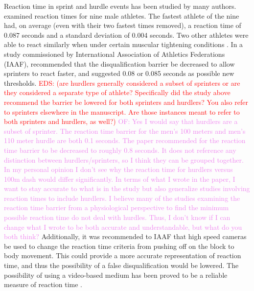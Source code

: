 \documentclass[12pt, letterpaper, titlepage]{article}
\newcommand{\eds}[1]{\textcolor{red}{EDS: (#1)}}
\newcommand{\of}[1]{\textcolor{violet}{OF: #1}}
\begin{document}
Reaction time in sprint and hurdle events has been studied by many authors.
\citet{pain2007sprint} examined
reaction times for nine male athletes.  The
fastest athlete of the nine had, on average (even with their two fastest times 
removed), a reaction time of 0.087 seconds and a standard deviation of 0.004
seconds.  Two other athletes were able to react similarly when under certain
muscular tightening conditions \citep{pain2007sprint}. 
In a study commissioned by International Association of Athletics Federations 
(IAAF), \citet{komi2009iaaf} recommended that the disqualification 
barrier be decreased to allow sprinters to
react faster, and suggested 0.08 or 0.085 seconds as possible new thresholds.
\eds{are hurdlers generally considered a subset of sprinters or are they 
considered a separate type of athlete?  Specifically did the study above 
recommend the barrier be lowered for both sprinters and hurdlers?
You also refer to sprinters elsewhere in the manuscript.  Are those instances
meant to refer to both sprinters and hurdlers, as well?}
\of{Yes I would say that hurdlers are a subset of sprinter.  The reaction time
barrier for the men's 100 meters and men's 110 meter hurdle are both 0.1 seconds.
The paper recommended for the reaction time barrier to be decreased to roughly 0.8
seconds.  It does not reference any distinction between hurdlers/sprinters, so I
think they can be grouped together.  In my personal opinion I don't see why the
reaction time for hurdlers versus 100m dash would differ significantly.  In terms
of what I wrote in the paper, I want to stay accurate to what is in the study
but also generalize studies involving reaction times to include hurdlers.  I believe
many of the studies examining the reaction time barrier from a physiological
perspective to find the minimum possible reaction time do not deal with hurdles.
Thus, I don't know if I can change what I wrote to be both accurate and understandable,
but what do you both think?}
Additionally, it was recommended to IAAF that high speed cameras be used to
change the reaction time criteria from pushing off on the block to body
movement. This could provide a more accurate representation of reaction time, 
and thus the possibility of a false disqualification would be lowered.
The possibility of using a video-based medium has been proved to be a reliable
measure of reaction time \citep{mudric2015evaluation}.
\end{document}
